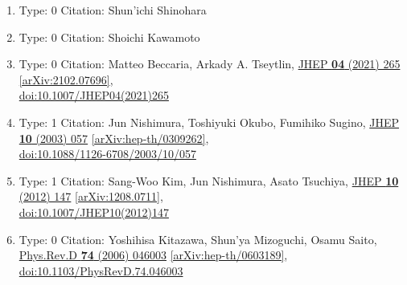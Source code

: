 \documentclass[a4paper,10pt]{article}
\begin{document}
\begin{enumerate}
\begin{enumerate}
  \item Type: 0 Citation: Shun'ichi Shinohara
  \item Type: 0 Citation: Shoichi Kawamoto
  \item Type: 0 Citation: Matteo Beccaria, Arkady A. Tseytlin, \href{https://www.doi.org/10.1007/JHEP04(2021)265}{JHEP {\bf 04} (2021) 265}  \href{https://arxiv.org/abs/2102.07696}{[arXiv:2102.07696]},\\\href{https://www.doi.org/10.1007/JHEP04(2021)265}{doi:10.1007/JHEP04(2021)265}
  \item Type: 1 Citation: Jun Nishimura, Toshiyuki Okubo, Fumihiko Sugino, \href{https://www.doi.org/10.1088/1126-6708/2003/10/057}{JHEP {\bf 10} (2003) 057}  \href{https://arxiv.org/abs/hep-th/0309262}{[arXiv:hep-th/0309262]},\\\href{https://www.doi.org/10.1088/1126-6708/2003/10/057}{doi:10.1088/1126-6708/2003/10/057}
  \item Type: 1 Citation: Sang-Woo Kim, Jun Nishimura, Asato Tsuchiya, \href{https://www.doi.org/10.1007/JHEP10(2012)147}{JHEP {\bf 10} (2012) 147}  \href{https://arxiv.org/abs/1208.0711}{[arXiv:1208.0711]},\\\href{https://www.doi.org/10.1007/JHEP10(2012)147}{doi:10.1007/JHEP10(2012)147}
  \item Type: 0 Citation: Yoshihisa Kitazawa, Shun'ya Mizoguchi, Osamu Saito, \href{https://www.doi.org/10.1103/PhysRevD.74.046003}{Phys.Rev.D {\bf 74} (2006) 046003}  \href{https://arxiv.org/abs/hep-th/0603189}{[arXiv:hep-th/0603189]},\\\href{https://www.doi.org/10.1103/PhysRevD.74.046003}{doi:10.1103/PhysRevD.74.046003}

\end{enumerate}
\end{enumerate}
\end{document}
